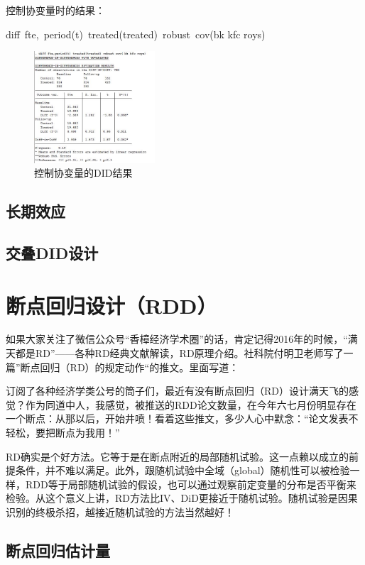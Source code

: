 \documentclass[cn,10pt,math=newtx,citestyle=gb7714-2015,bibstyle=gb7714-2015]{elegantbook}
\begin{document}
	控制协变量时的结果：
	
	diff~fte,~period(t)~treated(treated)~robust~cov(bk kfc roys)
	\begin{figure}[htbp]
		\centering
		\includegraphics[width=0.4\textwidth]{DIDcov.jpg}
		\caption{控制协变量的DID结果}\label{fig:digit}
	\end{figure}
	
	
	\subsection{长期效应}
	
	
	\subsection{交叠DID设计}
	
	
	
	\section{断点回归设计（RDD）}
	
	如果大家关注了微信公众号“香樟经济学术圈”的话，肯定记得2016年的时候，“满天都是RD”——各种RD经典文献解读，RD原理介绍。社科院付明卫老师写了一篇”断点回归（RD）的规定动作“的推文。里面写道：
	
	订阅了各种经济学类公号的筒子们，最近有没有断点回归（RD）设计满天飞的感觉？作为同道中人，我感觉，被推送的RDD论文数量，在今年六七月份明显存在一个断点：从那以后，开始井喷！看着这些推文，多少人心中默念：“论文发表不轻松，要把断点为我用！”
	
	RD确实是个好方法。它等于是在断点附近的局部随机试验。这一点赖以成立的前提条件，并不难以满足。此外，跟随机试验中全域（global）随机性可以被检验一样，RDD等于局部随机试验的假设，也可以通过观察前定变量的分布是否平衡来检验。从这个意义上讲，RD方法比IV、DiD更接近于随机试验。随机试验是因果识别的终极杀招，越接近随机试验的方法当然越好！
	
	\subsection{断点回归估计量}
	
\end{document}
